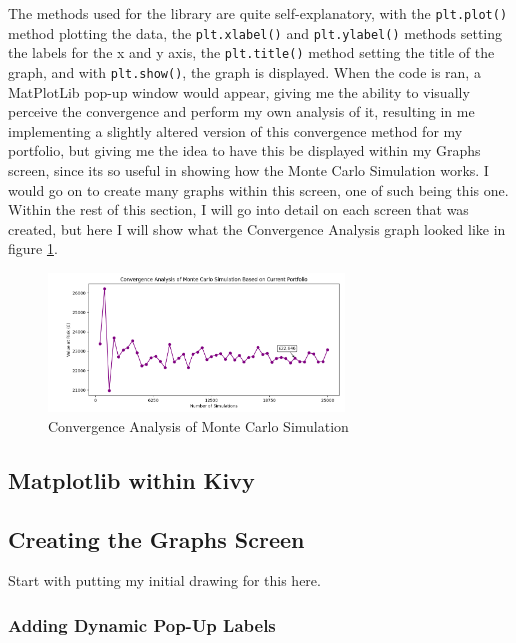 \documentclass{article}
\begin{document}
\vspace{0.3cm}
The methods used for the library are quite self-explanatory, with the \texttt{plt.plot()} method plotting the data, the \texttt{plt.xlabel()} and \texttt{plt.ylabel()} methods setting the labels for the x and y axis, the \texttt{plt.title()} method setting the title of the graph, and with \texttt{plt.show()}, the graph is displayed. When the code is ran, a MatPlotLib pop-up window would appear, giving me the ability to visually perceive the convergence and perform my own analysis of it, resulting in me implementing a slightly altered version of this convergence method for my portfolio, but giving me the idea to have this be displayed within my Graphs screen, since its so useful in showing how the Monte Carlo Simulation works. I would go on to create many graphs within this screen, one of such being this one. Within the rest of this section, I will go into detail on each screen that was created, but here I will show what the Convergence Analysis graph looked like in figure \ref{fig:Convergence Analysis}.\\\vspace{0.3cm}

\begin{figure}[h]
  \centering
  \includegraphics[width=0.7\textwidth]{Images/Term 2 Images/Image (1).png}
  \caption{Convergence Analysis of Monte Carlo Simulation}
  \label{fig:Convergence Analysis}
\end{figure}


\subsection{Matplotlib within Kivy}




\subsection{Creating the Graphs Screen}
Start with putting my initial drawing for this here.

\subsubsection{Adding Dynamic Pop-Up Labels}
\end{document}
